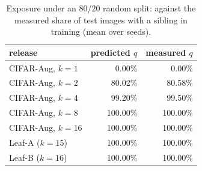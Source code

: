 \begin{table}[h]
\centering\footnotesize
\setlength{\tabcolsep}{4pt}
\caption{Exposure under an 80/20 random split:  against the measured share of test images with a sibling in training (mean over seeds).}
\label{tab:exposure}
\begin{tabular}{@{}lrr@{}}
\toprule
release & predicted $q$ & measured $q$ \\
\midrule
CIFAR-Aug, $k=1$ & 0.00\% & 0.00\% \\
CIFAR-Aug, $k=2$ & 80.02\% & 80.58\% \\
CIFAR-Aug, $k=4$ & 99.20\% & 99.50\% \\
CIFAR-Aug, $k=8$ & 100.00\% & 100.00\% \\
CIFAR-Aug, $k=16$ & 100.00\% & 100.00\% \\
Leaf-A ($k=15$) & 100.00\% & 100.00\% \\
Leaf-B ($k=16$) & 100.00\% & 100.00\% \\
\bottomrule
\end{tabular}
\end{table}
